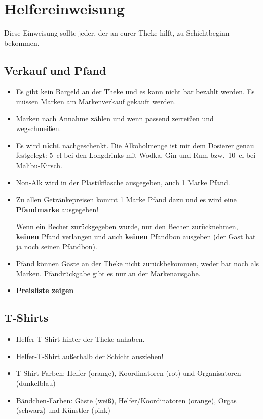\section{Helfereinweisung}
Diese Einweisung sollte jeder, der an eurer Theke hilft, zu Schichtbeginn bekommen.
\subsection{Verkauf und Pfand}
\begin{itemize}
        \renewcommand{\labelitemi}{$\Box$}
    \item Es gibt kein Bargeld an der Theke und es kann nicht bar bezahlt werden. Es müssen Marken am Markenverkauf gekauft werden.
    \item Marken nach Annahme zählen und wenn passend zerreißen und wegschmeißen.
    \item Es wird \textbf{nicht} nachgeschenkt. Die Alkoholmenge ist mit dem Dosierer genau festgelegt: \SI{5}{\centi\litre} bei den Longdrinks mit Wodka, Gin und Rum bzw.\ \SI{10}{\centi\litre} bei Malibu-Kirsch.
    \item Non-Alk wird in der Plastikflasche ausgegeben, auch 1 Marke Pfand.
    \item Zu allen Getränkepreisen kommt 1 Marke Pfand dazu und es wird eine \textbf{Pfandmarke} ausgegeben!

        Wenn ein Becher zurückgegeben wurde, nur den Becher zurücknehmen, \textbf{keinen} Pfand verlangen und auch \textbf{keinen} Pfandbon ausgeben (der Gast hat ja noch seinen Pfandbon).
    \item Pfand können Gäste an der Theke nicht zurückbekommen, weder bar noch als Marken. Pfandrückgabe gibt es nur an der Markenausgabe.
    \item \textbf{Preisliste zeigen}
\end{itemize}
\subsection{T-Shirts}
\begin{itemize}
        \renewcommand{\labelitemi}{$\Box$}
    \item Helfer-T-Shirt hinter der Theke anhaben.
    \item Helfer-T-Shirt außerhalb der Schicht ausziehen!
    \item T-Shirt-Farben: Helfer (orange), Koordinatoren (rot) und Organisatoren (dunkelblau)
    \item Bändchen-Farben: Gäste (weiß), Helfer/Koordinatoren (orange), Orgas (schwarz) und Künstler (pink)
\end{itemize}

